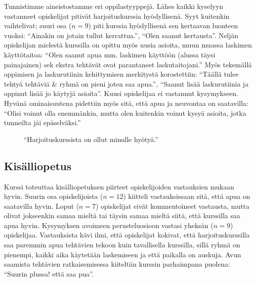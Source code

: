 Tunnistimme aineistostamme eri oppilastyyppejä.
Lähes kaikki kyselyyn vastanneet opiskelijat pitivät harjoituskurssia hyödyllisenä.
Syyt kuitenkin vaihtelivat; suuri osa ($n=9$) piti kurssia hyödyllisenä sen kertaavan luonteen vuoksi: ``Ainakin on jotain tullut kerrattua.'', ``Olen saanut kertausta''.
Neljän opiskelijan mielestä kurssilla on opittu myös uusia asioita, muun muassa laskimen käyttötaitoa: ``Olen saanut apua mm. laskimen käyttöön (alussa täysi painajainen) sek ekstra tehtävät ovat parantaneet laskutaitojani.''
Myös tekemällä oppimisen ja laskurutiinin kehittymisen merkitystä korostettiin: ``Täällä tulee tehtyä tehtäviä \& ryhmä on pieni joten saa apua.'', ``Saanut lisää laskurutiinia ja oppinut lisää jo käytyjä asioita''. 
Kuusi opiskelijaa ei vastannut kysymykseen.
Hyvänä ominaisuutena pidettiin myös sitä, että apua ja neuvontaa on saatavilla: ``Olisi voinut olla enemmänkin, mutta olen kuitenkin voinut kysyä asioita, jotka tunneilta jäi epäselväksi.''

\begin{figure}[h!]
\centering
{}
\caption{``Harjoituskurssista on ollut minulle hyötyä.''}
\end{figure}

\subsection{Kisälliopetus}
Kurssi toteuttaa kisälliopetuksen piirteet opiskelijoiden vastauksien mukaan hyvin.
Suurin osa opiskelijoista ($n=12$) kiitteli vastauksissaan sitä, että apua on saatavilla hyvin.
Loput ($n=7$) opiskelijat eivät kommentoineet vastausta, mutta olivat jokseenkin samaa mieltä tai täysin samaa mieltä siitä, että kurssilla saa apua hyvin.
Kysymyksen avoimeen perusteluosioon vastasi yheksän ($n=9$) opiskelijaa. Vastauksista kävi ilmi, että opiskelijat kokivat, että harjoituskurssilla saa paremmin apua tehtävien tekoon kuin tavallisella kurssilla, sillä ryhmä on pienempi, kaikki aika käytetään laskemiseen ja että paikalla on auskuja. Avun saamista tehtävien ratkaisemisessa kiiteltiin kurssin parhaimpana puolena: ``Suurin plussa! että saa pua''. 

